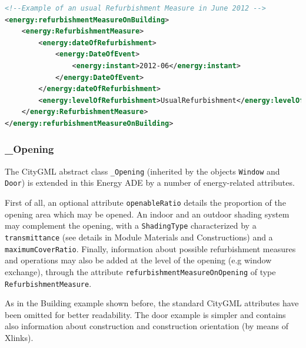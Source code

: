\documentclass[a4paper,12pt]{article}
\begin{document}
\begin{lstlisting}[language=XML]
<!--Example of an usual Refurbishment Measure in June 2012 -->
<energy:refurbishmentMeasureOnBuilding>
    <energy:RefurbishmentMeasure>
        <energy:dateOfRefurbishment>
            <energy:DateOfEvent>
                <energy:instant>2012-06</energy:instant>
            </energy:DateOfEvent>
        </energy:dateOfRefurbishment>
        <energy:levelOfRefurbishment>UsualRefurbishment</energy:levelOfRefurbishment>
    </energy:RefurbishmentMeasure>
</energy:refurbishmentMeasureOnBuilding>
\end{lstlisting}

\subsubsection{\_Opening}\label{opening}

The CityGML abstract class \lstinline!_Opening! (inherited by the
objects \lstinline!Window! and \lstinline!Door!) is extended in this
Energy ADE by a number of energy-related attributes.

First of all, an optional attribute \lstinline!openableRatio! details
the proportion of the opening area which may be opened. An indoor and an
outdoor shading system may complement the opening, with a
\lstinline!ShadingType! characterized by a \lstinline!transmittance!
(see details in Module Materials and Constructions) and a
\lstinline!maximumCoverRatio!. Finally, information about possible
refurbishment measures and operations may also be added at the level of
the opening (e.g window exchange), through the attribute
\lstinline!refurbishmentMeasureOnOpening! of type
\lstinline!RefurbishmentMeasure!.

As in the Building example shown before, the standard CityGML attributes
have been omitted for better readability. The door example is simpler
and contains also information about construction and construction
orientation (by means of Xlinks).
\end{document}

